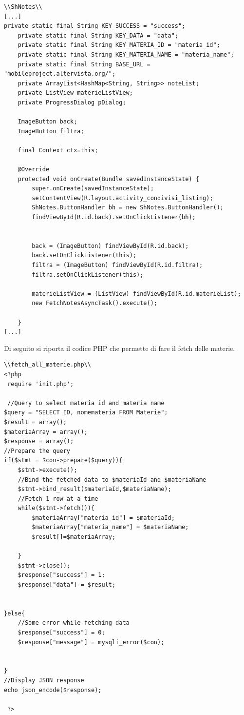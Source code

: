 \documentclass[a4paper, 50pt, twoside]{article}
\begin{document}
\begin{lstlisting}
\\ShNotes\\
[...]
private static final String KEY_SUCCESS = "success";
    private static final String KEY_DATA = "data";
    private static final String KEY_MATERIA_ID = "materia_id";
    private static final String KEY_MATERIA_NAME = "materia_name";
    private static final String BASE_URL = "mobileproject.altervista.org/";
    private ArrayList<HashMap<String, String>> noteList;
    private ListView materieListView;
    private ProgressDialog pDialog;

    ImageButton back;
    ImageButton filtra;

    final Context ctx=this;

    @Override
    protected void onCreate(Bundle savedInstanceState) {
        super.onCreate(savedInstanceState);
        setContentView(R.layout.activity_condivisi_listing);
        ShNotes.ButtonHandler bh = new ShNotes.ButtonHandler();
        findViewById(R.id.back).setOnClickListener(bh);


        back = (ImageButton) findViewById(R.id.back);
        back.setOnClickListener(this);
        filtra = (ImageButton) findViewById(R.id.filtra);
        filtra.setOnClickListener(this);

        materieListView = (ListView) findViewById(R.id.materieList);
        new FetchNotesAsyncTask().execute();

    }
[...]
\end{lstlisting}
\newpage
Di seguito si riporta il codice PHP che permette di fare il fetch delle materie.
\begin{lstlisting}
\\fetch_all_materie.php\\
<?php  
 require 'init.php';
 
 //Query to select materia id and materia name
$query = "SELECT ID, nomemateria FROM Materie";
$result = array();
$materiaArray = array();
$response = array();
//Prepare the query
if($stmt = $con->prepare($query)){
	$stmt->execute();
	//Bind the fetched data to $materiaId and $materiaName
	$stmt->bind_result($materiaId,$materiaName);
	//Fetch 1 row at a time					
	while($stmt->fetch()){
		$materiaArray["materia_id"] = $materiaId;
		$materiaArray["materia_name"] = $materiaName;
		$result[]=$materiaArray;
		
	}
	$stmt->close();
	$response["success"] = 1;
	$response["data"] = $result;
	

}else{
	//Some error while fetching data
	$response["success"] = 0;
	$response["message"] = mysqli_error($con);
		
	
}
//Display JSON response
echo json_encode($response);

 ?>  
\end{lstlisting}
\end{document}
